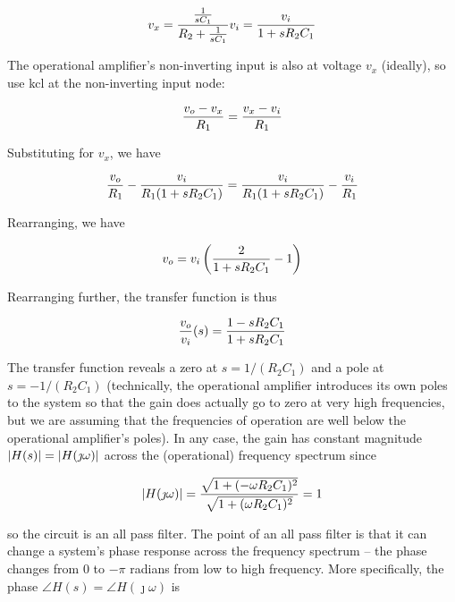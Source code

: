 \begin{equation}
	v_x = \frac{\frac{1}{sC_1}}{R_2 + \frac{1}{sC_1}}\vin = \frac{\vin}{1+s R_2 C_1}
\end{equation}

The operational amplifier's non-inverting input is also at voltage $v_x$ (ideally), so use \ac{kcl} at the non-inverting input node:

\begin{equation}
\frac{\vout - v_x}{R_1} = \frac{v_x - \vin}{R_1}
\end{equation}

Substituting for $v_x$, we have

\begin{equation}
\frac{\vout}{R_1}-\frac{\vin}{R_1(1+s R_2 C_1)} = \frac{\vin}{R_1(1+s R_2 C_1)}-\frac{\vin}{R_1}
\end{equation}

Rearranging, we have

\begin{equation}
\vout = \vin\left(\frac{2}{1+s R_2 C_1}-1\right)
\end{equation}

Rearranging further, the transfer function is thus

\textcolor{red}{
\begin{equation}
\frac{\vout}{\vin}(s) = \frac{1 - s R_2 C_1}{1 + s R_2 C_1}
\label{eq:1storderallpassfilter}
\end{equation}
}

The transfer function reveals a zero at $s = 1/(R_2 C_1)$ and a pole at $s = -1/(R_2 C_1)$ (technically, the operational amplifier introduces its own poles to the system so that the gain does actually go to zero at very high frequencies, but we are assuming that the frequencies of operation are well below the operational amplifier's poles).
In any case, the gain has constant magnitude $\left|H(s)\right| = \left|H(\jmath\omega)\right|$ across the (operational) frequency spectrum since

\begin{equation}
\left|H(\jmath\omega)\right|= \frac{\sqrt{1+(-\omega R_2 C_1)^2}}{\sqrt{1+(\omega R_2 C_1)^2}} = 1
\end{equation}

so the circuit is an all pass filter.
The point of an all pass filter is that it can change a system's phase response across the frequency spectrum -- the phase changes from $0$ to $-\pi$ radians from low to high frequency.
More specifically, the phase $\angle H(s) = \angle H(\jmath\omega)$ is

